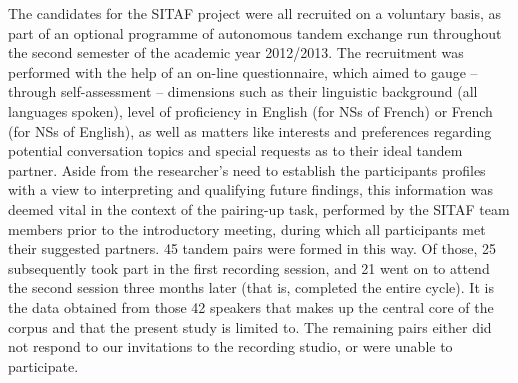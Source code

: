 \documentclass[12pt]{article}
\newenvironment{styleStandard}{\setlength\leftskip{0cm}\setlength\rightskip{0cm plus 1fil}\setlength\parindent{0cm}\setlength\parfillskip{0pt plus 1fil}\setlength\parskip{0cm plus 1pt}\writerlistparindent\writerlistleftskip\leavevmode\normalfont\normalsize\writerlistlabel\ignorespaces}{\unskip\vspace{0cm plus 1pt}\par}
\newcommand\writerlistleftskip{}
\newcommand\writerlistparindent{}
\newcommand\writerlistlabel{}
\begin{document}
\begin{styleStandard}
The candidates for the SITAF project were all recruited on a voluntary basis, as part of an optional programme of autonomous tandem exchange run throughout the second semester of the academic year 2012/2013. The recruitment was performed with the help of an on-line questionnaire, which aimed to gauge – through self-assessment – dimensions such as their linguistic background (all languages spoken), level of proficiency in English (for NSs of French) or French (for NSs of English), as well as matters like interests and preferences regarding potential conversation topics and special requests as to their ideal tandem partner. Aside from the researcher’s need to establish the participants profiles with a view to interpreting and qualifying future findings, this information was deemed vital in the context of the pairing-up task, performed by the SITAF team members prior to the introductory meeting, during which all participants met their suggested partners. 45 tandem pairs were formed in this way. Of those, 25 subsequently took part in the first recording session, and 21 went on to attend the second session three months later (that is, completed the entire cycle). It is the data obtained from those 42 speakers that makes up the central core of the corpus and that the present study is limited to. The remaining pairs either did not respond to our invitations to the recording studio, or were unable to participate.
\end{styleStandard}
\end{document}
